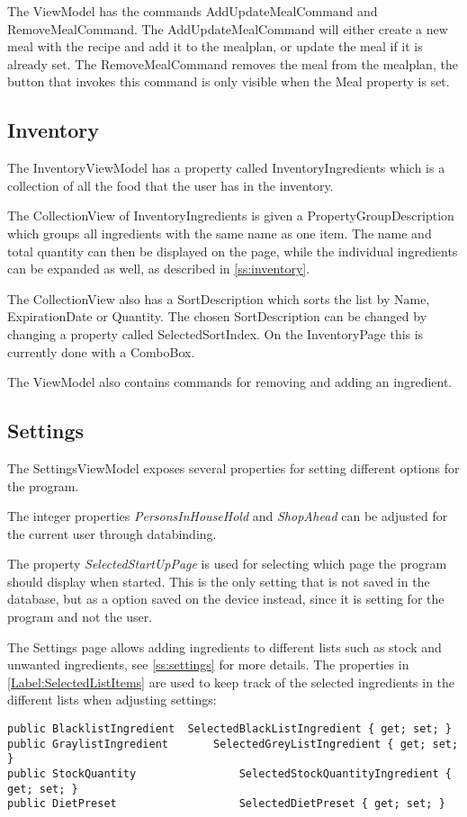 The ViewModel has the commands AddUpdateMealCommand and RemoveMealCommand. The AddUpdateMealCommand will either create a new meal with the recipe and add it to the mealplan, or update the meal if it is already set.
The RemoveMealCommand removes the meal from the mealplan, the button that invokes this command is only visible when the Meal property is set.


\subsection{Inventory}
The InventoryViewModel has a property called InventoryIngredients which is a collection of all the food that the user has in the inventory.

The CollectionView of InventoryIngredients is given a PropertyGroupDescription which groups all ingredients with the same name as one item. The name and total quantity can then be displayed on the page, while the individual ingredients can be expanded as well, as described in \cref{ss:inventory}.

The CollectionView also has a SortDescription which sorts the list by Name, ExpirationDate or Quantity. The chosen SortDescription can be changed by changing a property called SelectedSortIndex. On the InventoryPage this is currently done with a ComboBox.

The ViewModel also contains commands for removing and adding an ingredient.

\subsection{Settings}
The SettingsViewModel exposes several properties for setting different options for the program.

The integer properties \textit{PersonsInHouseHold} and \textit{ShopAhead} can be adjusted for the current user through databinding.

The property \textit{SelectedStartUpPage} is used for selecting which page the program should display when started. This is the only setting that is not saved in the database, but as a option saved on the device instead, since it is setting for the program and not the user.

The Settings page allows adding ingredients to different lists such as stock and unwanted ingredients, see \cref{ss:settings} for more details.
The properties in \cref{Label:SelectedListItems} are used to keep track of the selected ingredients in the different lists when adjusting settings:
\begin{lstlisting}[caption=Selected list items, language=CSharp, label={Label:SelectedListItems}]
public BlacklistIngredient	SelectedBlackListIngredient { get; set; }
public GraylistIngredient		SelectedGreyListIngredient { get; set; }
public StockQuantity 				SelectedStockQuantityIngredient { get; set; }
public DietPreset 					SelectedDietPreset { get; set; }
\end{lstlisting}

